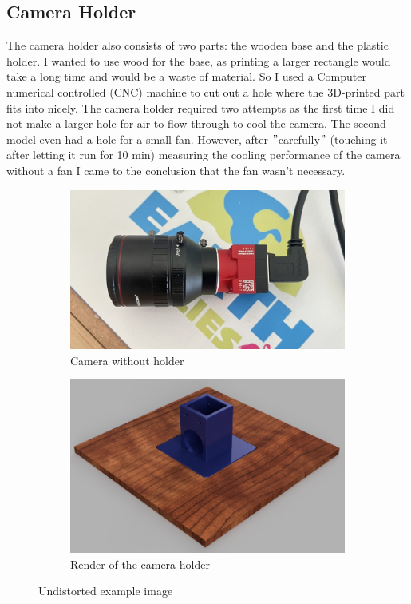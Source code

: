 \subsection{Camera Holder}\label{subsec:camera-holder}
The camera holder also consists of two parts: the wooden base and the plastic holder.
I wanted to use wood for the base, as printing a larger rectangle would take a long time and would be a waste of material.
So I used a Computer numerical controlled (CNC) machine to cut out a hole where the 3D-printed part fits into nicely.
The camera holder required two attempts as the first time I did not make a larger hole for air to flow through to cool the camera.
The second model even had a hole for a small fan.
However, after \("\)carefully\("\) (touching it after letting it run for 10 min) measuring the cooling performance of the camera without a fan I came to the conclusion that the fan wasn't necessary.
\begin{figure}[H]
    \centering
    \begin{subfigure}{.5\textwidth}
        \centering
        \includegraphics[width=.8\textwidth]{../photos/cam}
        \caption[cam]{Camera without holder}
        \label{fig:cam}
    \end{subfigure}%
    \begin{subfigure}{.5\textwidth}
        \centering
        \includegraphics[width=.8\textwidth]{../photos/camholder_render}
        \caption[camholder]{Render of the camera holder}
        \label{fig:camholder_render}
    \end{subfigure}
    \caption{Undistorted example image}
    \label{fig:camholder}
\end{figure}